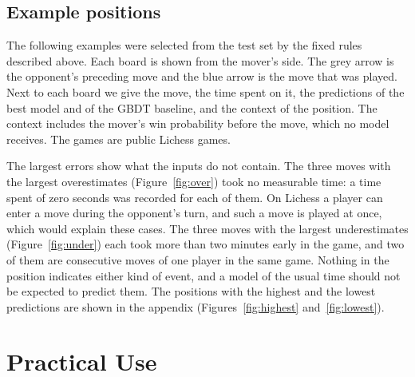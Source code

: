 \documentclass[11pt]{article}
\begin{document}
\subsection{Example positions}
\label{sec:positions}

The following examples were selected from the test set by the fixed rules
described above. Each board is shown from the mover's side. The grey arrow is
the opponent's preceding move and the blue arrow is the move that was played.
Next to each board we give the move, the time spent on it, the predictions of
the best model and of the GBDT baseline, and the context of the position. The
context includes the mover's win probability before the move, which no model
receives. The games are public Lichess games.

The largest errors show what the inputs do not contain. The three moves with
the largest overestimates (Figure~\ref{fig:over}) took no measurable time: a
time spent of zero seconds was recorded for each of them. On Lichess a player
can enter a move during the opponent's turn, and such a move is played at
once, which would explain these cases. The three moves with the largest
underestimates (Figure~\ref{fig:under}) each took more than two minutes early
in the game, and two of them are consecutive moves of one player in the same
game. Nothing in the position indicates either kind of event, and a model of
the usual time should not be expected to predict them. The positions with the
highest and the lowest predictions are shown in the appendix
(Figures~\ref{fig:highest} and~\ref{fig:lowest}).



\fi

\section{Practical Use}
\label{sec:use}
\end{document}
